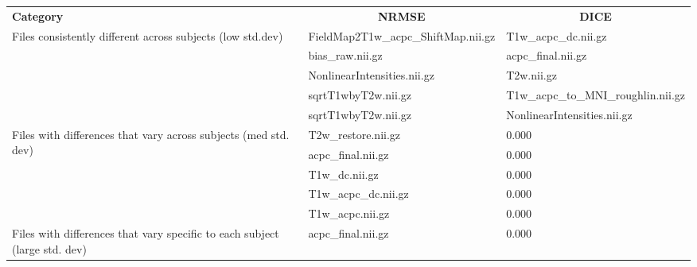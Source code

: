\hfill \break
\begin{center}
\begin{tabularx}{\textwidth}{|l|X|X|X|X|}
\cline{1-5}
\textbf{Category} & \multicolumn{2}{|c|}{\textbf{NRMSE}} & \multicolumn{2}{c|}{\textbf{DICE}} \\\cline{1-5}
\multirow{5}{3cm}{Files consistently different across subjects (low std.dev)}   & \multicolumn{2}{|l|}{FieldMap2T1w\_acpc\_ShiftMap.nii.gz}    & \multicolumn{2}{l|}{T1w\_acpc\_dc.nii.gz} \\\cline{2-5}
                                                                & \multicolumn{2}{|l|}{bias\_raw.nii.gz}                       & \multicolumn{2}{l|}{acpc\_final.nii.gz} \\\cline{2-5}
                                                                & \multicolumn{2}{|l|}{NonlinearIntensities.nii.gz}            & \multicolumn{2}{l|}{T2w.nii.gz} \\\cline{2-5}
                                                                & \multicolumn{2}{|l|}{sqrtT1wbyT2w.nii.gz}                    & \multicolumn{2}{l|}{T1w\_acpc\_to\_MNI\_roughlin.nii.gz} \\\cline{2-5}
                                                                & \multicolumn{2}{|l|}{sqrtT1wbyT2w.nii.gz}                    & \multicolumn{2}{l|}{NonlinearIntensities.nii.gz} \\\cline{1-5}
\multirow{5}{3cm}{Files with differences that vary across subjects (med std. dev)}   & \multicolumn{2}{|l|}{T2w\_restore.nii.gz}  & \multicolumn{2}{l|}{0.000} \\\cline{2-5}
                                                                & \multicolumn{2}{|l|}{acpc\_final.nii.gz}                        & \multicolumn{2}{l|}{0.000} \\\cline{2-5}
                                                                & \multicolumn{2}{|l|}{T1w\_dc.nii.gz}                            & \multicolumn{2}{l|}{0.000} \\\cline{2-5}
                                                                & \multicolumn{2}{|l|}{T1w\_acpc\_dc.nii.gz}                      & \multicolumn{2}{l|}{0.000} \\\cline{2-5}
                                                                & \multicolumn{2}{|l|}{T1w\_acpc.nii.gz}                          & \multicolumn{2}{l|}{0.000} \\\cline{1-5}
\multirow{5}{3cm}{Files with differences that vary specific to each subject (large std. dev)}   & \multicolumn{2}{|l|}{acpc\_final.nii.gz}  & \multicolumn{2}{l|}{0.000} \\\cline{2-5}

\end{tabularx}
\end{center}
